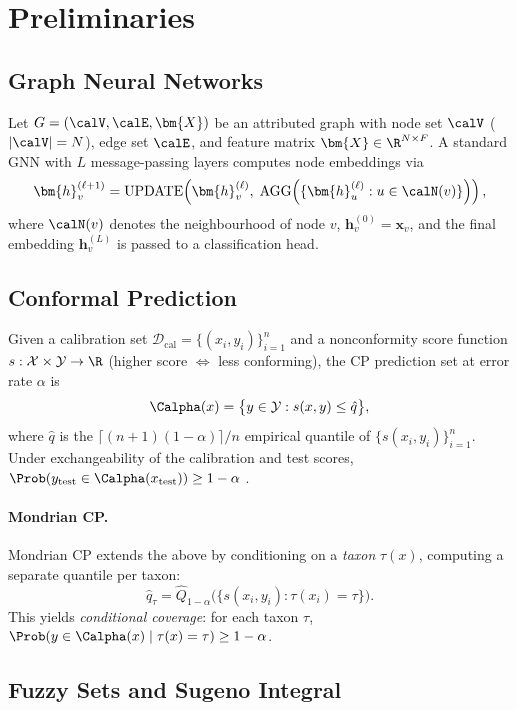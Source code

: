 \section{Preliminaries}
\label{sec:prelim}

\subsection{Graph Neural Networks}

Let $G = (\calV, \calE, \bm{X})$ be an attributed graph with node set
$\calV$ ($|\calV|=N$), edge set $\calE$, and feature matrix
$\bm{X} \in \R^{N \times F}$.
A standard GNN with $L$ message-passing layers computes node embeddings via
\[
  \bm{h}_v^{(\ell+1)}
  = \text{UPDATE}\!\left(\bm{h}_v^{(\ell)},\;
    \text{AGG}\!\left(\{\bm{h}_u^{(\ell)} : u \in \calN(v)\}\right)\right),
\]
where $\calN(v)$ denotes the neighbourhood of node $v$,
$\bm{h}_v^{(0)} = \bm{x}_v$, and the final embedding $\bm{h}_v^{(L)}$ is
passed to a classification head.

\subsection{Conformal Prediction}

Given a calibration set $\mathcal{D}_\text{cal} = \{(x_i, y_i)\}_{i=1}^n$
and a nonconformity score function $s : \mathcal{X} \times \mathcal{Y}
\to \R$ (higher score $\Leftrightarrow$ less conforming), the CP prediction
set at error rate $\alpha$ is
\[
  \Calpha(x) = \bigl\{y \in \mathcal{Y} : s(x,y) \le \hat{q}\bigr\},
\]
where $\hat{q}$ is the $\lceil (n+1)(1-\alpha) \rceil / n$ empirical
quantile of $\{s(x_i, y_i)\}_{i=1}^n$.
Under exchangeability of the calibration and test scores,
$\Prob(y_\text{test} \in \Calpha(x_\text{test})) \ge 1-\alpha$
\citep{angelopoulos21}.

\paragraph{Mondrian CP.}
Mondrian CP \citep{vovk05} extends the above by conditioning on a
\emph{taxon} $\tau(x)$, computing a separate quantile per taxon:
\[
  \hat{q}_\tau = \hat{Q}_{1-\alpha}\bigl(\{s(x_i,y_i) : \tau(x_i)=\tau\}\bigr).
\]
This yields \emph{conditional coverage}: for each taxon $\tau$,
$\Prob(y \in \Calpha(x) \mid \tau(x) = \tau) \ge 1-\alpha$.

\subsection{Fuzzy Sets and Sugeno Integral}

